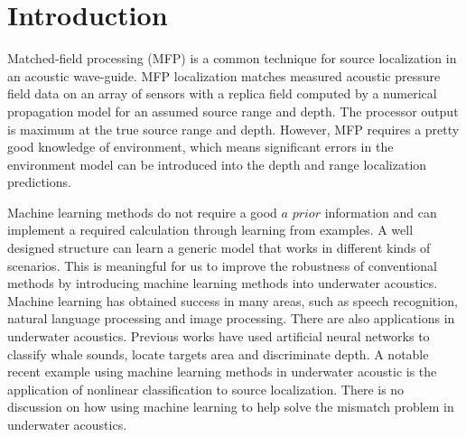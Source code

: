 \section{Introduction}
Matched-field processing (MFP) is a common technique for source localization in an acoustic
wave-guide\cite{bucker1976use,baggeroer1988matched,baggeroer1993overview}.
MFP localization matches measured acoustic pressure field data on an array of sensors with a replica field computed by a numerical propagation model for an assumed source range and depth. The processor output is maximum at the true source range and depth. However, MFP requires a pretty good knowledge of environment, which means significant errors in the environment model can be introduced into the
depth and range localization predictions\cite{tolstoy1989sensitivity,del1988effects}.

Machine learning methods do not require a good $a$ $prior$ information and can implement a required calculation through learning from examples. A well designed structure can learn a generic model that works in different kinds of scenarios. This is meaningful for us to improve the robustness of conventional methods by introducing machine learning methods into underwater acoustics.
Machine learning  has obtained success in many areas, such as speech recognition, natural language processing and image processing. There are also applications in underwater acoustics.
Previous works have used artificial neural networks to classify whale sounds\cite{thode2012automated}, locate targets area\cite{steinberg1991neural} and discriminate depth\cite{ozard1991artificial}.
A notable recent example using machine learning methods in underwater acoustic is the application of nonlinear classification to source localization\cite{niu2017source}. There is no discussion on how using machine learning to help solve the mismatch problem in underwater acoustics.

